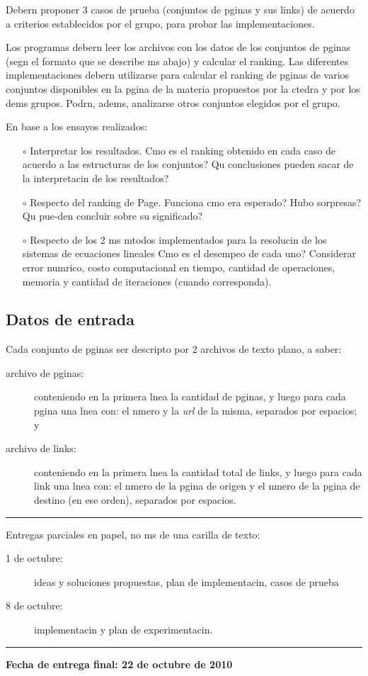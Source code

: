 Debern proponer 3 casos de prueba (conjuntos de pginas y sus links) de acuerdo a criterios establecidos por el grupo, para probar las implementaciones.

Los programas debern leer los archivos con los datos de los conjuntos de pginas (segn el formato que se describe ms abajo) y calcular el ranking.
Las diferentes implementaciones debern utilizarse para calcular el ranking de pginas de varios conjuntos disponibles en la pgina de la materia propuestos por la ctedra y por los dems grupos. Podrn, adems, analizarse otros conjuntos elegidos por el grupo.

En base a los ensayos realizados:
\begin{itemize}
\item[$\circ$] Interpretar los resultados. Cmo es el ranking obtenido en cada caso de acuerdo a las estructuras de los conjuntos? Qu conclusiones pueden sacar de la interpretacin de los resultados?
\item[$\circ$] Respecto del ranking de Page. Funciona cmo era esperado? Hubo sorpresas? Qu pue-den concluir sobre su significado?
\item[$\circ$] Respecto de los 2  ms mtodos implementados para la resolucin de los sistemas de ecuaciones lineales Cmo es el desempeo de cada uno? Considerar error numrico, costo computacional en tiempo, cantidad de operaciones, memoria y cantidad de iteraciones (cuando corresponda).
\end{itemize}


\subsection*{Datos de entrada}
Cada conjunto de pginas ser descripto por 2 archivos de texto plano, a saber:
  \setlength{\itemsep}{1pt}
  \setlength{\parskip}{0pt}
  \setlength{\parsep}{0pt}
\begin{description}
 \item[archivo de pginas:] conteniendo en la primera lnea la cantidad de pginas, y luego para cada pgina una lnea con: el nmero y la \emph{url} de la misma, separados por espacios; y
\item[archivo de links:] conteniendo en la primera lnea la cantidad total de links, y luego para cada link una lnea con: el nmero de la pgina de origen y el nmero de la pgina de destino (en ese orden), separados por espacios.
\end{description}




\vskip 15pt
\hrule
\vskip 11pt

Entregas parciales en papel, no ms de una carilla de texto:
\begin{description}
 \item[1 de octubre:] ideas y soluciones propuestas, plan de implementacin, casos de prueba
 \item[8 de octubre:] implementacin y plan de experimentacin.
\end{description}

\vskip 15pt
\hrule
\vskip 11pt

\textbf{Fecha de entrega final: 22 de octubre de 2010}